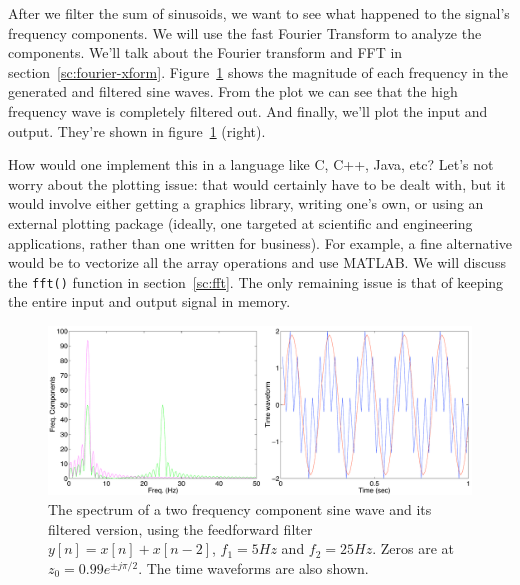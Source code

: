 After we filter the sum of sinusoids, we want to see what happened to the signal's frequency components. We will use the fast Fourier Transform to analyze the components. We'll talk about
the Fourier transform and FFT in section~\ref{sc:fourier-xform}.
Figure~\ref{fig:ff-expsin2_sp} shows the magnitude of each frequency in the generated and filtered sine waves. From the plot we can see that the high frequency wave is completely filtered out. And finally, we'll plot the input and output. They're shown in
figure~\ref{fig:ff-expsin2_sp} (right).


How would one implement this in a language like C, C++, Java, etc?
Let's not worry about the plotting issue: that would certainly have to
be dealt with, but it would involve either getting a graphics library,
writing one's own, or using an external plotting package (ideally, one
targeted at scientific and engineering applications, rather than one
written for business).  For example, a fine alternative would be to 
vectorize all the array operations and use MATLAB.  We will
discuss the \verb|fft()| function in section~\ref{sc:fft}. The
only remaining issue is that of keeping the entire input and output
signal in memory.
\begin{figure}
\centerline{\includegraphics[width=6in]{ch-fir/sine2_ff2td_sp_wv}}
\caption[Two sinusoid spectrum]{The spectrum of a two frequency component sine wave and its filtered version,
using the feedforward filter $y[n]=x[n]+x[n-2]$, $f_1=5Hz$ and
$f_2=25Hz$. Zeros are at $z_0=0.99e^{\pm j\pi/2}$. The time waveforms are also shown.
\label{fig:ff-expsin2_sp}}
\end{figure}

